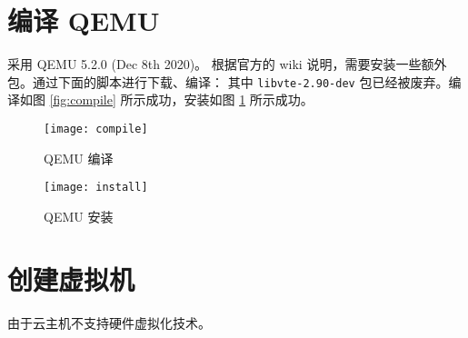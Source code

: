 



    \section{编译 QEMU}
    采用 QEMU 5.2.0 (Dec 8th 2020)。
    根据官方的 wiki 说明\cite{installwiki}，需要安装一些额外包。通过下面的脚本进行下载、编译：
    其中 \verb"libvte-2.90-dev" 包已经被废弃。编译如图 \ref{fig:compile} 所示成功，安装如图 \ref{fig:install} 所示成功。
    \begin{figure}[h]
        \centering
        \begin{minipage}{0.48\textwidth}
            \centering
            \texttt{[image: compile]}
            \caption{QEMU 编译}\label{fig:compile}
        \end{minipage}
        \begin{minipage}{0.48\textwidth}
            \texttt{[image: install]}
            \caption{QEMU 安装}\label{fig:install}
        \end{minipage}
    \end{figure}


    \section{创建虚拟机}

    由于云主机不支持硬件虚拟化技术。

    
